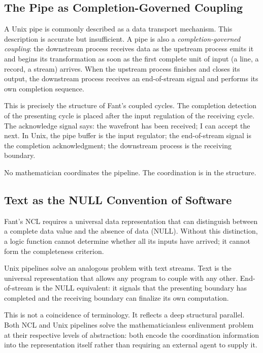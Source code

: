 \documentclass[12pt, a4paper]{article}
\begin{document}
\subsection{The Pipe as Completion-Governed Coupling}

A Unix pipe is commonly described as a data transport mechanism. This
description is accurate but insufficient. A pipe is also a
\emph{completion-governed coupling}: the downstream process receives
data as the upstream process emits it and begins its transformation
as soon as the first complete unit of input (a line, a record, a
stream) arrives. When the upstream process finishes and closes its
output, the downstream process receives an end-of-stream signal and
performs its own completion sequence.

This is precisely the structure of Fant's coupled cycles. The
completion detection of the presenting cycle is placed after the input
regulation of the receiving cycle. The acknowledge signal says: the
wavefront has been received; I can accept the next. In Unix, the pipe
buffer is the input regulator; the end-of-stream signal is the
completion acknowledgment; the downstream process is the receiving
boundary.

No mathematician coordinates the pipeline. The coordination is in the
structure.

\subsection{Text as the NULL Convention of Software}

Fant's NCL requires a universal data representation that can
distinguish between a complete data value and the absence of data
(NULL). Without this distinction, a logic function cannot determine
whether all its inputs have arrived; it cannot form the completeness
criterion.

Unix pipelines solve an analogous problem with text streams. Text is
the universal representation that allows any program to couple with
any other. End-of-stream is the NULL equivalent: it signals that the
presenting boundary has completed and the receiving boundary can
finalize its own computation.

This is not a coincidence of terminology. It reflects a deep
structural parallel. Both NCL and Unix pipelines solve the
mathematicianless enlivenment problem at their respective levels of
abstraction: both encode the coordination information into the
representation itself rather than requiring an external agent to
supply it.
\end{document}
